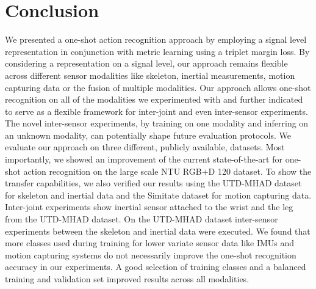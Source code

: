 \documentclass[10pt,conference,a4paper]{IEEEtran}
\begin{document}
\section{Conclusion}
We presented a one-shot action recognition approach by employing a signal level representation in conjunction with metric learning using a triplet margin loss. 
By considering a representation on a signal level, our approach remains flexible across different sensor modalities like skeleton, inertial measurements, motion capturing data or the fusion of multiple modalities. 
Our approach allows one-shot recognition on all of the modalities we experimented with and further indicated to serve as a flexible framework for inter-joint and even inter-sensor experiments. 
The novel inter-sensor experiments, by training on one modality and inferring on an unknown modality, can potentially shape future evaluation protocols.
We evaluate our approach on three different, publicly available, datasets. Most importantly, we showed an improvement of the current state-of-the-art for one-shot action recognition on the large scale NTU RGB+D 120 dataset. To show the transfer capabilities, we also verified our results using the UTD-MHAD dataset for skeleton and inertial data and the Simitate dataset for motion capturing data. Inter-joint experiments show inertial sensor attached to the wrist and the leg from the UTD-MHAD dataset.  On the UTD-MHAD dataset inter-sensor experiments between the skeleton and inertial data were executed. 
We found that more classes used during training for lower variate sensor data like IMUs and motion capturing systems do not necessarily improve the one-shot recognition accuracy in our experiments.  
A good selection of training classes and a balanced training and validation set
improved results across all modalities.  


\end{document}
